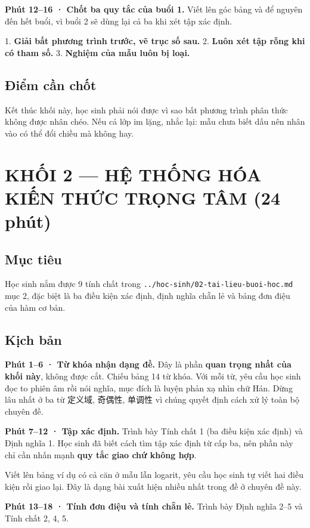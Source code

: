 \documentclass[11pt, a4paper]{article}
\begin{document}
\textbf{Phút 12–16 · Chốt ba quy tắc của buổi 1.} Viết lên góc bảng và để nguyên đến hết buổi, vì buổi 2 sẽ dùng lại cả ba khi xét tập xác định.

1. \textbf{Giải bất phương trình trước, vẽ trục số sau.}
2. \textbf{Luôn xét tập rỗng khi có tham số.}
3. \textbf{Nghiệm của mẫu luôn bị loại.}

\subsection{Điểm cần chốt}

Kết thúc khối này, học sinh phải nói được vì sao bất phương trình phân thức không được nhân chéo. Nếu cả lớp im lặng, nhắc lại: mẫu chưa biết dấu nên nhân vào có thể đổi chiều mà không hay.

\section{KHỐI 2 — HỆ THỐNG HÓA KIẾN THỨC TRỌNG TÂM (24 phút)}

\subsection{Mục tiêu}

Học sinh nắm được 9 tính chất trong \texttt{../hoc-sinh/02-tai-lieu-buoi-hoc.md} mục 2, đặc biệt là ba điều kiện xác định, định nghĩa chẵn lẻ và bảng đơn điệu của hàm cơ bản.

\subsection{Kịch bản}

\textbf{Phút 1–6 · Từ khóa nhận dạng đề.} Đây là phần \textbf{quan trọng nhất của khối này}, không được cắt. Chiếu bảng 14 từ khóa. Với mỗi từ, yêu cầu học sinh đọc to phiên âm rồi nói nghĩa, mục đích là luyện phản xạ nhìn chữ Hán. Dừng lâu nhất ở ba từ 定义域, 奇偶性, 单调性 vì chúng quyết định cách xử lý toàn bộ chuyên đề.

\textbf{Phút 7–12 · Tập xác định.} Trình bày Tính chất 1 (ba điều kiện xác định) và Định nghĩa 1. Học sinh đã biết cách tìm tập xác định từ cấp ba, nên phần này chỉ cần nhấn mạnh \textbf{quy tắc giao chứ không hợp}.

Viết lên bảng ví dụ có cả căn ở mẫu lẫn logarit, yêu cầu học sinh tự viết hai điều kiện rồi giao lại. Đây là dạng bài xuất hiện nhiều nhất trong đề ở chuyên đề này.

\textbf{Phút 13–18 · Tính đơn điệu và tính chẵn lẻ.} Trình bày Định nghĩa 2–5 và Tính chất 2, 4, 5.
\end{document}
